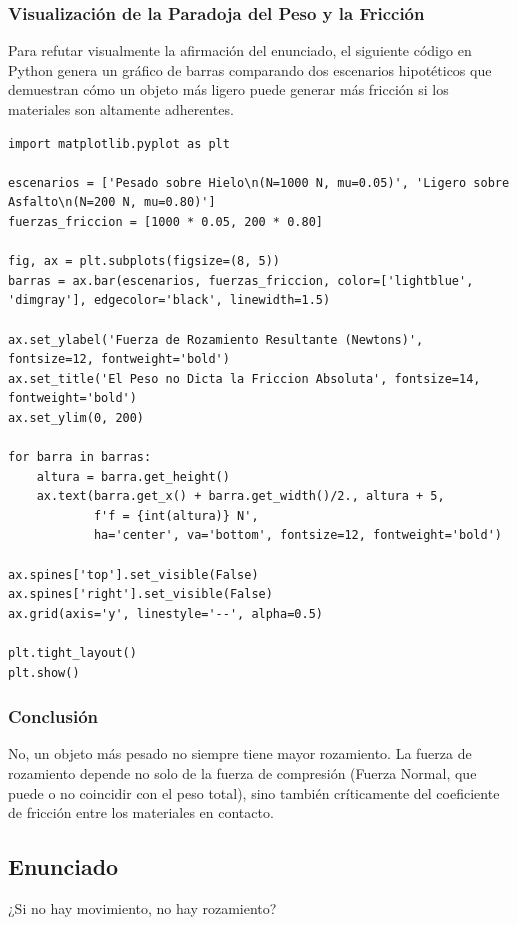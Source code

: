\documentclass[12pt]{article}
\begin{document}
\subsubsection*{Visualización de la Paradoja del Peso y la Fricción}
Para refutar visualmente la afirmación del enunciado, el siguiente código en Python genera un gráfico de barras comparando dos escenarios hipotéticos que demuestran cómo un objeto más ligero puede generar más fricción si los materiales son altamente adherentes.

\begin{lstlisting}
import matplotlib.pyplot as plt

escenarios = ['Pesado sobre Hielo\n(N=1000 N, mu=0.05)', 'Ligero sobre Asfalto\n(N=200 N, mu=0.80)']
fuerzas_friccion = [1000 * 0.05, 200 * 0.80]

fig, ax = plt.subplots(figsize=(8, 5))
barras = ax.bar(escenarios, fuerzas_friccion, color=['lightblue', 'dimgray'], edgecolor='black', linewidth=1.5)

ax.set_ylabel('Fuerza de Rozamiento Resultante (Newtons)', fontsize=12, fontweight='bold')
ax.set_title('El Peso no Dicta la Friccion Absoluta', fontsize=14, fontweight='bold')
ax.set_ylim(0, 200)

for barra in barras:
    altura = barra.get_height()
    ax.text(barra.get_x() + barra.get_width()/2., altura + 5,
            f'f = {int(altura)} N',
            ha='center', va='bottom', fontsize=12, fontweight='bold')

ax.spines['top'].set_visible(False)
ax.spines['right'].set_visible(False)
ax.grid(axis='y', linestyle='--', alpha=0.5)

plt.tight_layout()
plt.show()
\end{lstlisting}

\subsubsection*{Conclusión}
No, un objeto más pesado no siempre tiene mayor rozamiento. La fuerza de rozamiento depende no solo de la fuerza de compresión (Fuerza Normal, que puede o no coincidir con el peso total), sino también críticamente del coeficiente de fricción entre los materiales en contacto.

\newpage

\subsection*{Enunciado}
¿Si no hay movimiento, no hay rozamiento?
\end{document}
